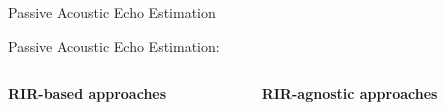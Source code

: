 \begin{frame}[t]{Passive Acoustic Echo Estimation}

    \begin{block}{\alert{Passive} Acoustic Echo Estimation:}
        \small

        \pause
        \vspace{.5em}
        \begin{columns}[T,onlytextwidth] %
            \begin{column}{.48\textwidth}
                \textbf{RIR-\alert{based} approaches}
            \end{column}
            \begin{column}{.48\textwidth}
                \textbf{RIR-\alert{agnostic} approaches}
            \end{column}%
        \end{columns}


\end{block}
\end{frame}
